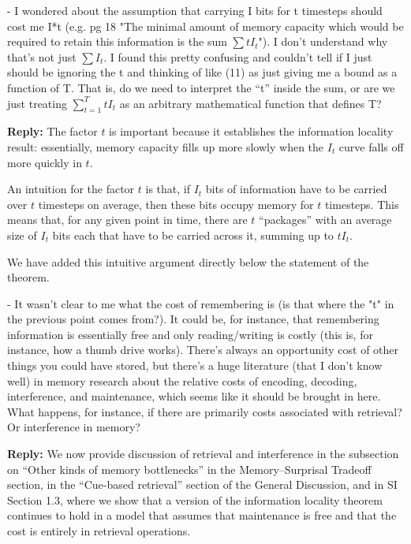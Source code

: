\documentclass{article}[11pt,a4paper,oneside]
\newenvironment{reply}
  {\par\medskip
   \color{blue}%
   \begin{framed}
   \textbf{Reply: }\ignorespaces}
 {\end{framed}
  \medskip}
\begin{document}
- I wondered about the assumption that carrying I bits for t timesteps should cost me I*t (e.g. pg 18 "The minimal amount of memory capacity which would be required to retain this information is the sum $\sum t I_t$"). I don't understand why that's not just $\sum I_t$. I found this pretty confusing and couldn't tell if I just should be ignoring the t and thinking of like (11) as just giving me a bound as a function of T. That is, do we need to interpret the ``t'' inside the sum, or are we just treating $\sum_{t=1}^T t I_t$ as an arbitrary mathematical function that defines T?

\begin{reply}
The factor $t$ is important because it establishes the information locality result: essentially, memory capacity fills up more slowly when the $I_t$ curve falls off more quickly in $t$.

An intuition for the factor $t$ is that, if $I_t$ bits of information have to be carried over $t$ timesteps on average, then these bits occupy memory for $t$ timesteps.
This means that, for any given point in time, there are $t$ ``packages'' with an average size of $I_t$ bits each that have to be carried across it, summing up to $t I_t$.

We have added this intuitive argument directly below the statement of the theorem.
\end{reply}

- It wasn't clear to me what the cost of remembering is (is that where the "t" in the previous point comes from?). It could be, for instance, that remembering information is essentially free and only reading/writing is costly (this is, for instance, how a thumb drive works). There's always an opportunity cost of other things you could have stored, but there's a huge literature (that I don't know well) in memory research about the relative costs of encoding, decoding, interference, and maintenance, which seems like it should be brought in here. What happens, for instance, if there are primarily costs associated with retrieval? Or interference in memory?

\begin{reply}
We now provide discussion of retrieval and interference in the subsection on ``Other kinds of memory bottlenecks'' in the Memory--Surprisal Tradeoff section, in the ``Cue-based retrieval'' section of the General Discussion, and in SI Section 1.3, where we show that a version of the information locality theorem continues to hold in a model that assumes that maintenance is free and that the cost is entirely in retrieval operations.
\end{reply}
\end{document}
